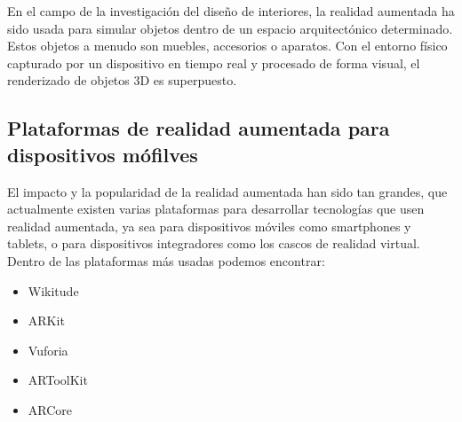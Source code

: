 En el campo de la investigación del diseño de interiores, la realidad aumentada ha sido usada para simular objetos dentro de un espacio arquitectónico determinado. Estos objetos a menudo son muebles, accesorios o aparatos. Con el entorno físico capturado por un dispositivo en tiempo real y procesado de forma visual, el renderizado de objetos 3D es superpuesto.\cite{B15}

\subsection{Plataformas de realidad aumentada para dispositivos mófilves}
El impacto y la popularidad de la realidad aumentada han sido tan grandes, que actualmente existen varias plataformas para desarrollar tecnologías que usen realidad aumentada, ya sea para dispositivos móviles como smartphones y tablets, o para dispositivos integradores como los cascos de realidad virtual. Dentro de las plataformas más usadas podemos encontrar:
\begin{itemize}
	\item Wikitude
	\item ARKit
	\item Vuforia
	\item ARToolKit
	\item ARCore
\end{itemize}
\newpage

